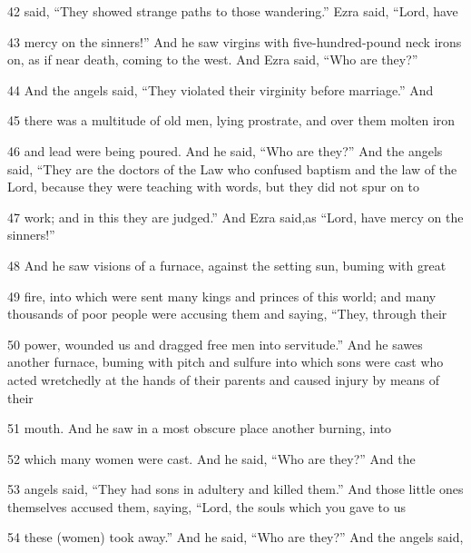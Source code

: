 \par 42 said, “They showed strange paths to those wandering.” Ezra said, “Lord, have

\par 43 mercy on the sinners!” And he saw virgins with five-hundred-pound neck irons on, as if near death, coming to the west. And Ezra said, “Who are they?”

\par 44 And the angels said, “They violated their virginity before marriage.” And

\par 45 there was a multitude of old men, lying prostrate, and over them molten iron

\par 46 and lead were being poured. And he said, “Who are they?” And the angels said, “They are the doctors of the Law who confused baptism and the law of the Lord, because they were teaching with words, but they did not spur on to

\par 47 work; and in this they are judged.” And Ezra said,as “Lord, have mercy on the sinners!”

\par 48 And he saw visions of a furnace, against the setting sun, buming with great

\par 49 fire, into which were sent many kings and princes of this world; and many thousands of poor people were accusing them and saying, “They, through their 

\par 50 power, wounded us and dragged free men into servitude.” And he sawes another furnace, buming with pitch and sulfure into which sons were cast who acted wretchedly at the hands of their parents and caused injury by means of their

\par 51 mouth. And he saw in a most obscure place another burning, into

\par 52 which many women were cast. And he said, “Who are they?” And the

\par 53 angels said, “They had sons in adultery and killed them.” And those little ones themselves accused them, saying, “Lord, the souls which you gave to us

\par 54 these (women) took away.” And he said, “Who are they?” And the angels said, 

